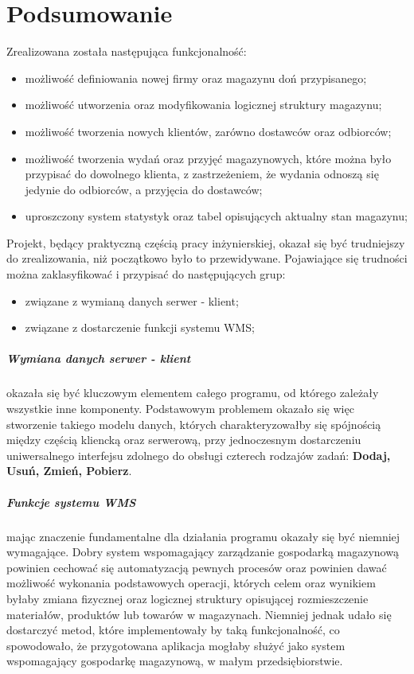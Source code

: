 \chapter{Podsumowanie}
\label{c7:c7}
	Zrealizowana została następująca funkcjonalność:
	\begin{itemize}
		\item możliwość definiowania nowej firmy oraz magazynu doń przypisanego;
		\item możliwość utworzenia oraz modyfikowania logicznej struktury magazynu;
		\item możliwość tworzenia nowych klientów, zarówno dostawców oraz odbiorców;
		\item możliwość tworzenia wydań oraz przyjęć magazynowych, które można było przypisać do
		dowolnego klienta, z zastrzeżeniem, że wydania odnoszą się jedynie do odbiorców, a przyjęcia
		do dostawców;
		\item uproszczony system statystyk oraz tabel opisujących aktualny stan magazynu;
	\end{itemize}
	
	Projekt, będący praktyczną częścią pracy inżynierskiej, okazał się być trudniejszy do zrealizowania,
	niż początkowo było to przewidywane. Pojawiające się trudności można zaklasyfikować i przypisać 
	do następujących grup:
	\begin{itemize}
		\item związane z wymianą danych serwer - klient;
		\item związane z dostarczenie funkcji systemu WMS; 
	\end{itemize}		
	
	\paragraph{Wymiana danych serwer - klient} okazała się być kluczowym elementem całego programu, 
	od którego zależały wszystkie inne komponenty. Podstawowym problemem okazało się więc stworzenie
	takiego modelu danych, których charakteryzowałby się spójnością między częścią kliencką oraz serwerową,
	przy jednoczesnym dostarczeniu uniwersalnego interfejsu zdolnego do obsługi czterech rodzajów
	zadań: \textbf{Dodaj, Usuń, Zmień, Pobierz}. 
	
	\paragraph{Funkcje systemu WMS} mając znaczenie fundamentalne dla działania programu okazały
	się być niemniej wymagające. Dobry system wspomagający zarządzanie gospodarką magazynową powinien
	cechować się automatyzacją pewnych procesów oraz powinien dawać możliwość wykonania
	podstawowych operacji, których celem oraz wynikiem byłaby zmiana fizycznej oraz logicznej struktury
	opisującej rozmieszczenie materiałów, produktów lub towarów w magazynach.
	Niemniej jednak udało się dostarczyć metod, które implementowały by taką funkcjonalność, co spowodowało,
	że przygotowana aplikacja mogłaby służyć jako system wspomagający gospodarkę magazynową, w 
	małym przedsiębiorstwie.